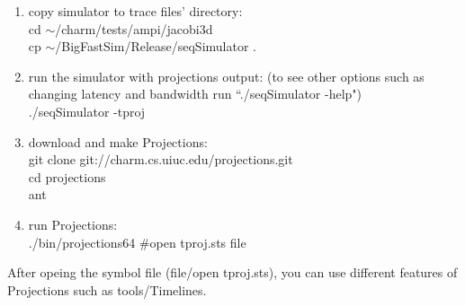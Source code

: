 \begin{enumerate}
\item copy simulator to trace files' directory:\\
        cd $\sim$/charm/tests/ampi/jacobi3d\\
        cp $\sim$/BigFastSim/Release/seqSimulator .\\

\item run the simulator with projections output: (to see other options such as changing latency and bandwidth run ``./seqSimulator -help")\\
        ./seqSimulator -tproj\\

\item download and make Projections:\\
        git clone git://charm.cs.uiuc.edu/projections.git\\
        cd projections\\
        ant\\

\item run Projections:\\
        ./bin/projections64 \#open tproj.sts file\\

\end{enumerate}

After opeing the symbol file (file/open tproj.sts), you can use different features of Projections such as tools/Timelines.
